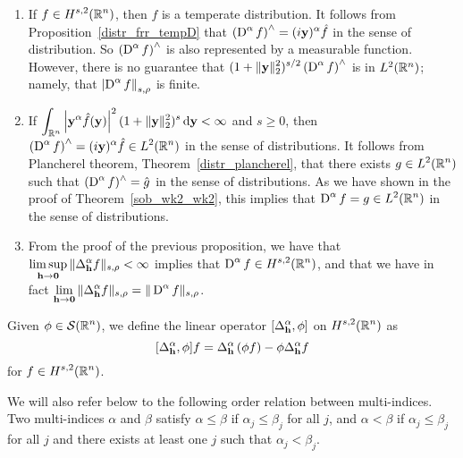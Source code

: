 \begin{rmkList} \label{ell_reg_prop3_rmk}
\begin{enumerate}
\item If $\displaystyle f \in H^{s,2}(\mathbb{R}^n)$, then $f$ is a temperate
distribution.  It follows from Proposition~\ref{distr_frr_tempD}
that $\displaystyle \left(\operatorname{D}^\alpha f\right)^\wedge =
(i\mathbf{y})^\alpha \hat{f}$ in the sense of distribution.  So
$\displaystyle \left(\operatorname{D}^\alpha f\right)^\wedge$ is also represented
by a measurable function.  However, there is no guarantee that
$\displaystyle (1+\|\mathbf{y}\|_2^2)^{s/2} \left(\operatorname{D}^\alpha f\right)^\wedge$
is in $L^2(\mathbb{R}^n)$; namely, that
$\displaystyle \left|\operatorname{D}^\alpha f \right\|_{s,\rho}$
is finite.
\item If $\displaystyle
\int_{\mathbb{R}^n} \left| \mathbf{y}^\alpha \hat{f}(\mathbf{y})\right|^2
(1 + \|\mathbf{y}\|_2^2)^s \,\mathrm{d}{\mathbf{y}} < \infty$ and $s \geq 0$, then
$\displaystyle \left(\operatorname{D}^\alpha f\right)^\wedge
= (i\mathbf{y})^\alpha \hat{f} \in L^2(\mathbb{R}^n)$ in the sense of distributions.
It follows from Plancherel theorem, Theorem~\ref{distr_plancherel},
that there exists $\displaystyle g \in L^2(\mathbb{R}^n)$
such that $\displaystyle (\operatorname{D}^\alpha f)^\wedge = \hat{g}$ in the sense of
distributions.  As we have shown in the proof of
Theorem~\ref{sob_wk2_wk2}, this implies that
$\displaystyle \operatorname{D}^\alpha f = g \in L^2(\mathbb{R}^n)$ in the sense of
distributions.  
\item  From the proof of the previous proposition, we have that
$\displaystyle \limsup_{\mathbf{h}\rightarrow \mathbf{0}}
\|\Delta^\alpha_{\mathbf{h}} f\|_{s,\rho} < \infty$ implies that
$\displaystyle \operatorname{D}^\alpha f \in H^{s,2}(\mathbb{R}^n)$, and that we have in fact
$\displaystyle \lim_{\mathbf{h}\rightarrow \mathbf{0}}
\|\Delta^\alpha_{\mathbf{h}} f\|_{s,\rho}
= \|\operatorname{D}^\alpha f\|_{s,\rho}$.
\end{enumerate}
\end{rmkList}

Given $\displaystyle \phi \in \mathcal{S}(\mathbb{R}^n)$, we define the linear operator
$\displaystyle [\Delta^\alpha_{\mathbf{h}}, \phi]$ on
$\displaystyle H^{s,2}(\mathbb{R}^n)$ as
\[
[\Delta^\alpha_{\mathbf{h}}, \phi]f = \Delta^\alpha_{\mathbf{h}} \left( \phi f \right) -
\phi \Delta^\alpha_{\mathbf{h}} f
\]
for $\displaystyle f \in H^{s,2}(\mathbb{R}^n)$.

We will also refer below to the following order relation between multi-indices.
Two multi-indices $\alpha$ and $\beta$ satisfy
$\alpha \leq \beta$ if $\alpha_j \leq \beta_j$ for all $j$,
and $\alpha < \beta$ if $\alpha_j \leq \beta_j$ for all $j$ and there
exists at least one $j$ such that $\alpha_j < \beta_j$.

